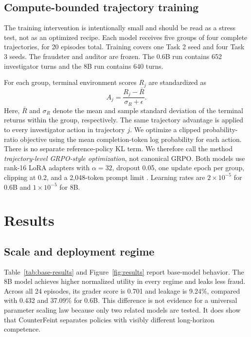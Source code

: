\documentclass{article}
\begin{document}
\subsection{Compute-bounded trajectory training}

The training intervention is intentionally small and should be read as a stress test, not as an optimized recipe. Each model receives five groups of four complete trajectories, for 20 episodes total. Training covers one Task 2 seed and four Task 3 seeds. The fraudster and auditor are frozen. The 0.6B run contains 652 investigator turns and the 8B run contains 640 turns.

For each group, terminal environment scores $R_j$ are standardized as
\begin{equation}
    A_j = \frac{R_j-\bar{R}}{\sigma_R+\epsilon}.
\end{equation}
Here, $\bar{R}$ and $\sigma_R$ denote the mean and sample standard deviation of the terminal returns within the group, respectively.
The same trajectory advantage is applied to every investigator action in trajectory $j$. We optimize a clipped probability-ratio objective using the mean completion-token log probability for each action. There is no separate reference-policy KL term. We therefore call the method \emph{trajectory-level GRPO-style optimization}, not canonical GRPO. Both models use rank-16 LoRA adapters with $\alpha=32$, dropout 0.05, one update epoch per group, clipping at 0.2, and a 2,048-token prompt limit \citep{hu2022lora}. Learning rates are $2\times10^{-5}$ for 0.6B and $1\times10^{-5}$ for 8B.

\section{Results}

\subsection{Scale and deployment regime}

Table~\ref{tab:base-results} and Figure~\ref{fig:results} report base-model behavior. The 8B model achieves higher normalized utility in every regime and leaks less fraud. Across all 24 episodes, its grader score is 0.701 and leakage is 9.24\%, compared with 0.432 and 37.09\% for 0.6B. This difference is not evidence for a universal parameter scaling law because only two related models are tested. It does show that CounterFeint separates policies with visibly different long-horizon competence.
\end{document}
